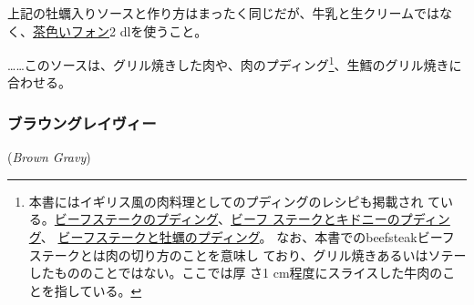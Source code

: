 \begin{recette}
上記の牡蠣入りソースと作り方はまったく同じだが、牛乳と生クリームではな
く、\protect\hyperlink{fonds-brun}{茶色いフォン}2 dlを使うこと。

\ldots{}\ldots{}このソースは、グリル焼きした肉や、肉のプディング\footnote{本書にはイギリス風の肉料理としてのプディングのレシピも掲載され
  ている。\protect\hyperlink{beefteak-pudding}{ビーフステークのプディング}、\protect\hyperlink{beefsteak-and-kidney-pudding}{ビーフ
  ステークとキドニーのプディング}、
  \protect\hyperlink{beefsteak-and-oysters-pudding}{ビーフステークと牡蠣のプディング}。
  なお、本書でのbeefsteakビーフステークとは肉の切り方のことを意味し
  ており、グリル焼きあるいはソテーしたもののことではない。ここでは厚 さ1
  cm程度にスライスした牛肉のことを指している。}、生鱈のグリル焼きに合わせる。

\maeaki

\hypertarget{brown-gravy}{%
\subsubsection{ブラウングレイヴィー}\label{brown-gravy}}

\hspace{1em}(\emph{Brown Gravy})



\end{recette}
